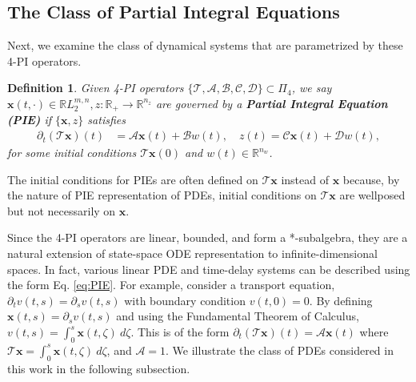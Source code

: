 \documentclass[letterpaper, 10 pt, conference]{ieeeconf}
\newtheorem{definition}{Definition}
\newcommand{\R}{\mathbb{R}}
\newcommand{\mcl}[1]{\mathcal{#1}}
\newcommand{\mbb}[1]{\mathbb{#1}}
\newcommand{\mbf}[1]{\mathbf{#1}}
\theoremstyle{definition}
\begin{document}
\subsection{The Class of Partial Integral Equations}
Next, we examine the class of dynamical systems that are parametrized by these 4-PI operators.
\begin{definition}
    Given 4-PI operators $\{\mcl T, \mcl A, \mcl B, \mcl C, \mcl D\}\subset \Pi_4$, we say $\mbf x(t,\cdot)\in \R L_2^{m,n}, z:\R_+ \to \R^{n_z}$ are governed by a {\bf Partial Integral Equation (PIE)} if $\{\mbf x,z\}$ satisfies
    \begin{align}
        \label{eq:PIE}
        \partial_t\left(\mcl T\mbf x\right)(t) &= \mcl A \mbf x(t) \!+\! \mcl B w(t),\quad z(t) = \mcl C \mbf x(t)\!+\!\mcl D w(t),
    \end{align}
    for some initial conditions $\mcl T\mbf x(0)$ and $w(t) \in \mbb{R}^{n_w}$.
\end{definition}
The initial conditions for PIEs are often defined on $\mcl T\mbf x$ instead of $\mbf x$ because, by the nature of PIE representation of PDEs, initial conditions on $\mcl T\mbf x$ are wellposed but not necessarily on $\mbf x$.

Since the 4-PI operators are linear, bounded, and form a *-subalgebra, they are a natural extension of state-space ODE representation to infinite-dimensional spaces. In fact, various linear PDE and time-delay systems \cite{shivakumar_extension_2024} can be described using the form Eq. \eqref{eq:PIE}. For example, consider a transport equation, $\partial_t v(t,s) = \partial_s v(t,s)$ with boundary condition $v(t,0) = 0$. By defining $\mbf{x}(t,s) = \partial_s v(t,s)$ and using the Fundamental Theorem of Calculus, $v(t,s) = \int_0^s \mbf{x}(t,\zeta) \ d\zeta$. This is of the form $\partial_t(\mcl T \mbf{x})(t) = \mcl A\mbf{x}(t)$ where $\mcl T\mbf{x} = \int_0^s \mbf{x}(t,\zeta) \ d\zeta $, and $\mcl A = 1$. We illustrate the class of PDEs considered in this work in the following subsection.


\end{document}
